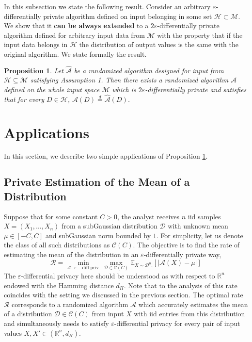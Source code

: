 \documentclass[12pt,a4paper]{article}
\numberwithin{equation}{section}
\newtheorem{proposition}[theorem]{Proposition}
\numberwithin{equation}{section}
\renewcommand{\epsilon}{\varepsilon}
\newcommand{\1}{{\text{\Large $\mathfrak 1$}}}
\newcommand{\2}[1]{{\text{\Large $\mathfrak 1$}\!\left(#1\right)}}
\begin{document}
In this subsection we state the following result. Consider an arbitrary $\epsilon$-differentially private algorithm defined on input belonging in some set $\mathcal{H} \subset \mathcal{M}.$ We show that it \textbf{can be always extended} to a $2\epsilon$-differentially private algorithm defined for arbitrary input data from $\mathcal{M}$ with the property that if the input data belongs in $\mathcal{H}$ the distribution of output values is the same with the original algorithm. We state formally the result. 

\begin{proposition}\label{extension}
Let $\hat{\mathcal{A}}$ be a randomized algorithm designed for input from $\mathcal{H} \subseteq \mathcal{M}$ satisfying Assumption 1. Then there exists a randomized algorithm $\mathcal{A}$ defined on the whole input space $\mathcal{M}$ which is $2\epsilon$-differentially private and satisfies that for every $D \in \mathcal{H}$, $\mathcal{A}(D) \overset{d}{=}  \hat{\mathcal{A}}(D)$.
\end{proposition}

\section{Applications}


In this section, we describe two simple applications of Proposition \ref{extension}. 
\subsection*{Private Estimation of the Mean of a Distribution}
Suppose that for some constant $C>0$, the analyst receives $n$ iid samples $X=(X_1,\ldots,X_n)$ from a subGaussian distribution $\mathcal{D}$ with unknown mean $\mu \in [-C,C]$ and subGaussian norm bounded by $1$. For simplicity, let us denote the class of all such distributions as $\mathcal{C}\left(C\right)$. The objective is to find the rate of estimating the mean of the distribution in an $\epsilon$-differentially private way,
\begin{equation*}
\mathcal{R}=\min_{ \mathcal{A} \text{   } \epsilon-\text{diff.priv.}} \max_{ \mathcal{D} \in \mathcal{C}\left(C\right)} \mathbb{E}_{X \sim \mathcal{D}^{n}.}[|\mathcal{A}(X)-\mu|]
\end{equation*}The $\epsilon$-differential privacy here should be understood as with respect to $\mathbb{R}^n$ endowed with the Hamming distance $d_H$. Note that to the analysis of this rate coincides with the setting we discussed in the previous section. The optimal rate $\mathcal{R}$ corresponds to a randomized algorithm $\mathcal{A}$ which accurately estimates the mean of a distribution $\mathcal{D} \in \mathcal{C}\left(C\right)$ from input $X$ with iid entries from this distribution and simultaneously needs to satisfy $\epsilon$-differential privacy for every pair of input values $X,X' \in (\mathbb{R}^n,d_H)$.
\end{document}
